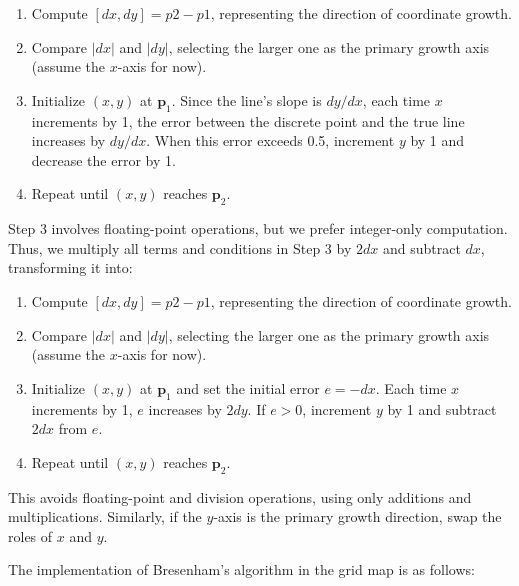 \begin{enumerate}  
	\item Compute $[dx, dy] = p2 - p1$, representing the direction of coordinate growth.  
	\item Compare $|dx|$ and $|dy|$, selecting the larger one as the primary growth axis (assume the $x$-axis for now).  
	\item Initialize $(x, y)$ at $\mathbf{p}_1$. Since the line's slope is $dy/dx$, each time $x$ increments by 1, the error between the discrete point and the true line increases by $dy/dx$. When this error exceeds 0.5, increment $y$ by 1 and decrease the error by 1.  
	\item Repeat until $(x, y)$ reaches $\mathbf{p}_2$.  
\end{enumerate}  

Step 3 involves floating-point operations, but we prefer integer-only computation. Thus, we multiply all terms and conditions in Step 3 by $2dx$ and subtract $dx$, transforming it into:  

\begin{enumerate}  
	\item Compute $[dx, dy] = p2 - p1$, representing the direction of coordinate growth.  
	\item Compare $|dx|$ and $|dy|$, selecting the larger one as the primary growth axis (assume the $x$-axis for now).  
	\item Initialize $(x, y)$ at $\mathbf{p}_1$ and set the initial error $e = -dx$. Each time $x$ increments by 1, $e$ increases by $2dy$. If $e > 0$, increment $y$ by 1 and subtract $2dx$ from $e$.  
	\item Repeat until $(x, y)$ reaches $\mathbf{p}_2$.  
\end{enumerate}  

This avoids floating-point and division operations, using only additions and multiplications. Similarly, if the $y$-axis is the primary growth direction, swap the roles of $x$ and $y$.  

The implementation of Bresenham's algorithm in the grid map is as follows:  

